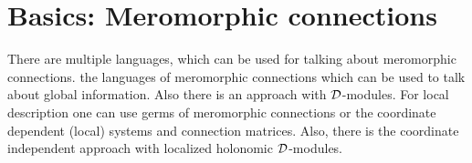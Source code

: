 \chapter{Basics: Meromorphic connections}
\begin{comment}
  \begin{multicols}{2}
    \textbf{Global}
    \begin{itemize}
      \item Meromorphic connection
      \item $\cD$-modules (global)
    \end{itemize}
    \columnbreak
    \textbf{Local}
    \begin{itemize}
      \item Germ of a meromorphic connection
      \item $\cD$-modules (local)
      \item System
        \begin{itemize}
          \item coordinate dependent
        \end{itemize}
      \item Conection matrix
        \begin{itemize}
          \item coordinate dependent
        \end{itemize}
    \end{itemize}
  \end{multicols}
\end{comment}
There are multiple languages, which can be used for talking about meromorphic
connections.
 the languages of meromorphic connections which can be used to
talk about global information. Also there is an approach with $\mathcal{D}$-modules.
For local description one can use germs of meromorphic connections or the
coordinate dependent (local) systems and connection matrices. 
Also, there is the coordinate independent approach with localized holonomic
$\mathcal{D}$-modules.

\begin{comment}
  Siehe:
  \begin{multicols}{3}
    \begin{itemize}
      \item \cite{boalch} and \cite{thboalch}
      \item \cite{sabbah2007isomonodromic}
      \item \cite{Varadarajan96linearmeromorphic}
      \item \textbf{\cite[Chap.5]{hotta2008}}
    \end{itemize}
    \columnbreak
    Differential modules:
    \begin{itemize}
      \item \cite{Loday1994}
      \item \cite{Loday2014}
    \end{itemize}
  \end{multicols}
\end{comment}

